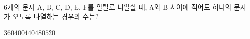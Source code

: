 \hspace*{2mm}\begin{minipage}[t]{\dimexpr\linewidth-2mm\relax}\vspace{0pt}
$6$개의 문자 $\mathrm{A}$, $\mathrm{B}$, $\mathrm{C}$, $\mathrm{D}$, $\mathrm{E}$, $\mathrm{F}$를 일렬로 나열할 때, $\mathrm{A}$와 $\mathrm{B}$ 사이에 적어도 하나의 문자가 오도록 나열하는 경우의 수는?
\begin{choices32}{$360$}{$400$}{$440$}{$480$}{$520$}\end{choices32}\end{minipage}
